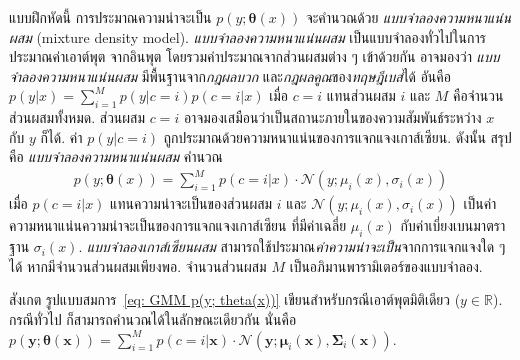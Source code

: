 \begin{Exercise}
%
แบบฝึกหัดนี้ การประมาณความน่าจะเป็น $p(y; \bm{\theta}(x))$ จะคำนวณด้วย \textit{แบบจำลองความหนาแน่นผสม} (mixture density model). 
\textit{แบบจำลองความหนาแน่นผสม} เป็นแบบจำลองทั่วไปในการประมาณค่าเอาต์พุต จากอินพุต
โดยรวมค่าประมาณจากส่วนผสมต่าง ๆ เข้าด้วยกัน
อาจมองว่า \textit{แบบจำลองความหนาแน่นผสม} มีพื้นฐานจาก\textit{กฎผลบวก} และ\textit{กฎผลคูณ}ของ\textit{ทฤษฎีเบส์}ได้
อันคือ $p(y|x) = \sum_{i=1}^M p(y|c=i) p(c=i|x)$
เมื่อ $c=i$ แทนส่วนผสม $i$ 
และ $M$ คือจำนวนส่วนผสมทั้งหมด.
ส่วนผสม $c=i$ อาจมองเสมือนว่าเป็นสถานะภายในของความสัมพันธ์ระหว่าง $x$ กับ $y$ ก็ได้.
ค่า $p(y|c=i)$ ถูกประมาณด้วยความหนาแน่นของการแจกแจงเกาส์เซียน.
ดังนั้น สรุปคือ \textit{แบบจำลองความหนาแน่นผสม} คำนวณ
\begin{eqnarray}
p(y; \bm{\theta}(x)) = \sum_{i=1}^M p(c=i|x) \cdot \mathcal{N}(y; \mu_i(x), \sigma_i(x)) 
\label{eq: GMM p(y; theta(x))}
\end{eqnarray}
เมื่อ $p(c=i|x)$ แทนความน่าจะเป็นของส่วนผสม $i$
และ
$\mathcal{N}(y; \mu_i(x), \sigma_i(x))$ เป็นค่าความหนาแน่นความน่าจะเป็นของการแจกแจงเกาส์เซียน ที่มีค่าเฉลี่ย $\mu_i(x)$ กับค่าเบี่ยงเบนมาตราฐาน $\sigma_i(x)$.
\textit{แบบจำลองเกาส์เซียนผสม} สามารถใช้ประมาณ\textit{ค่าความน่าจะเป็น}จากการแจกแจงใด ๆ ได้ หากมีจำนวนส่วนผสมเพียงพอ.
จำนวนส่วนผสม $M$ เป็นอภิมานพารามิเตอร์ของแบบจำลอง.

สังเกต รูปแบบสมการ~\ref{eq: GMM p(y; theta(x))} เขียนสำหรับกรณีเอาต์พุตมิติเดียว ($y \in \mathbb{R}$).
กรณีทั่วไป ก็สามารถคำนวณได้ในลักษณะเดียวกัน 
นั่นคือ 
$p(\bm{y}; \bm{\theta}(\bm{x})) = \sum_{i=1}^M p(c=i|\bm{x}) \cdot \mathcal{N}(\bm{y}; \bm{\mu}_i(\bm{x}), \bm{\Sigma}_i(\bm{x}))$.


\end{Exercise}
